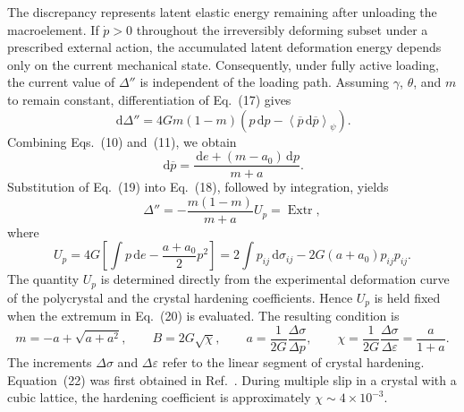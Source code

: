 \documentclass[11pt,a4paper]{article}
\numberwithin{equation}{section}
\newcommand{\avg}[2][]{\left\langle #2\right\rangle_{#1}}
\newcommand{\Extr}{\operatorname{Extr}}
\newcommand{\dd}{\,\mathrm{d}}
\begin{document}
The discrepancy represents latent elastic energy remaining after unloading the macroelement. If $\dot p>0$ throughout the irreversibly deforming subset under a prescribed external action, the accumulated latent deformation energy depends only on the current mechanical state. Consequently, under fully active loading, the current value of $\Delta''$ is independent of the loading path. Assuming $\gamma$, $\theta$, and $m$ to remain constant, differentiation of Eq.~(17) gives
\begin{equation}
 \dd\Delta''
 =4Gm(1-m)\left(p\dd p-\avg[\psi]{\overline p\dd\overline p}\right).
\end{equation}
Combining Eqs.~(10) and~(11), we obtain
\begin{equation}
 \dd\overline p
 =\frac{\dd e+(m-a_0)\dd p}{m+a}.
\end{equation}
Substitution of Eq.~(19) into Eq.~(18), followed by integration, yields
\begin{equation}
 \Delta''=-\frac{m(1-m)}{m+a}U_p=\Extr,
\end{equation}
where
\begin{equation}
 U_p
 =4G\left[\int p\dd e-\frac{a+a_0}{2}p^2\right]
 =2\int p_{ij}\dd\sigma_{ij}-2G(a+a_0)p_{ij}p_{ij}.
\end{equation}
The quantity $U_p$ is determined directly from the experimental deformation curve of the polycrystal and the crystal hardening coefficients. Hence $U_p$ is held fixed when the extremum in Eq.~(20) is evaluated. The resulting condition is
\begin{equation}
 m=-a+\sqrt{a+a^2},
 \qquad
 B=2G\sqrt{\chi},
 \qquad
 a=\frac{1}{2G}\frac{\Delta\sigma}{\Delta p},
 \qquad
 \chi=\frac{1}{2G}\frac{\Delta\sigma}{\Delta\varepsilon}
      =\frac{a}{1+a}.
\end{equation}
The increments $\Delta\sigma$ and $\Delta\varepsilon$ refer to the linear segment of crystal hardening. Equation~(22) was first obtained in Ref.~\cite{marina1997}. During multiple slip in a crystal with a cubic lattice, the hardening coefficient is approximately $\chi\sim4\times10^{-3}$.
\end{document}
